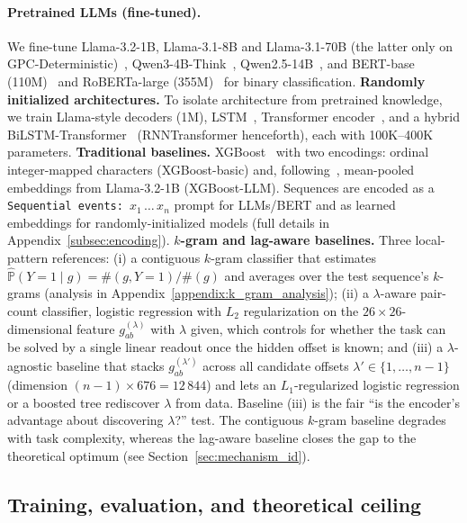 \documentclass{article}
\theoremstyle{plain}
\theoremstyle{definition}
\theoremstyle{remark}
\begin{document}
\paragraph{Pretrained LLMs (fine-tuned).} We fine-tune Llama-3.2-1B, Llama-3.1-8B and Llama-3.1-70B (the latter only on GPC-Deterministic)~\citep{touvron2023llama, grattafiori2024llama3}, Qwen3-4B-Think~\citep{bai2023qwen}, Qwen2.5-14B~\citep{qwen2.5, qwen2}, and BERT-base (110M)~\citep{devlin2019bert} and RoBERTa-large (355M)~\citep{liu2019robertarobustlyoptimizedbert} for binary classification. \textbf{Randomly initialized architectures.} To isolate architecture from pretrained knowledge, we train Llama-style decoders (1M), LSTM~\citep{hochreiter1997lstm}, Transformer encoder~\citep{vaswani2017attention}, and a hybrid BiLSTM-Transformer~\citep{graves2005bilstm} (RNNTransformer henceforth), each with 100K--400K parameters. \textbf{Traditional baselines.} XGBoost~\citep{chen2016xgboost} with two encodings: ordinal integer-mapped characters (XGBoost-basic) and, following~\citet{XGBoost_LLMs, XGBoost_LLMs_HF}, mean-pooled embeddings from Llama-3.2-1B (XGBoost-LLM). Sequences are encoded as a \texttt{Sequential events: $x_1\,\ldots\,x_n$} prompt for LLMs/BERT and as learned embeddings for randomly-initialized models (full details in Appendix~\ref{subsec:encoding}). \textbf{$k$-gram and lag-aware baselines.} Three local-pattern references: (i) a contiguous $k$-gram classifier that estimates $\hat{\mathbb{P}}(Y=1\mid g) = \#(g, Y=1)/\#(g)$ and averages over the test sequence's $k$-grams (analysis in Appendix~\ref{appendix:k_gram_analysis}); (ii) a $\lambda$-aware pair-count classifier, logistic regression with $L_2$ regularization on the $26\!\times\!26$-dimensional feature $g_{ab}^{(\lambda)}$ with $\lambda$ given, which controls for whether the task can be solved by a single linear readout once the hidden offset is known; and (iii) a $\lambda$-agnostic baseline that stacks $g_{ab}^{(\lambda')}$ across all candidate offsets $\lambda' \in \{1, \ldots, n{-}1\}$ (dimension $(n{-}1)\!\times\! 676 = 12\,844$) and lets an $L_1$-regularized logistic regression or a boosted tree rediscover $\lambda$ from data. Baseline (iii) is the fair ``is the encoder's advantage about discovering $\lambda$?'' test. The contiguous $k$-gram baseline degrades with task complexity, whereas the lag-aware baseline closes the gap to the theoretical optimum (see Section~\ref{sec:mechanism_id}).

\subsection{Training, evaluation, and theoretical ceiling}
\label{subsec:training}
\label{subsec:evaluation}
\end{document}
